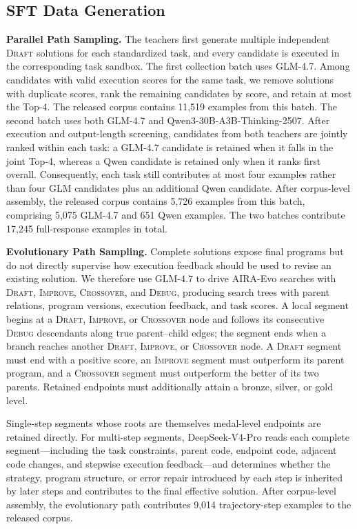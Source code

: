 \subsection{SFT Data Generation}
\label{app:sft-warm-start}

\textbf{Parallel Path Sampling.}
The teachers first generate multiple independent \textsc{Draft} solutions for each standardized task, and every candidate is executed in the corresponding task sandbox. The first collection batch uses GLM-4.7. Among candidates with valid execution scores for the same task, we remove solutions with duplicate scores, rank the remaining candidates by score, and retain at most the Top-4. The released corpus contains 11,519 examples from this batch. The second batch uses both GLM-4.7 and Qwen3-30B-A3B-Thinking-2507. After execution and output-length screening, candidates from both teachers are jointly ranked within each task: a GLM-4.7 candidate is retained when it falls in the joint Top-4, whereas a Qwen candidate is retained only when it ranks first overall. Consequently, each task still contributes at most four examples rather than four GLM candidates plus an additional Qwen candidate. After corpus-level assembly, the released corpus contains 5,726 examples from this batch, comprising 5,075 GLM-4.7 and 651 Qwen examples. The two batches contribute 17,245 full-response examples in total.

\textbf{Evolutionary Path Sampling.}
Complete solutions expose final programs but do not directly supervise how execution feedback should be used to revise an existing solution. We therefore use GLM-4.7 to drive AIRA-Evo searches with \textsc{Draft}, \textsc{Improve}, \textsc{Crossover}, and \textsc{Debug}, producing search trees with parent relations, program versions, execution feedback, and task scores. A local segment begins at a \textsc{Draft}, \textsc{Improve}, or \textsc{Crossover} node and follows its consecutive \textsc{Debug} descendants along true parent--child edges; the segment ends when a branch reaches another \textsc{Draft}, \textsc{Improve}, or \textsc{Crossover} node. A \textsc{Draft} segment must end with a positive score, an \textsc{Improve} segment must outperform its parent program, and a \textsc{Crossover} segment must outperform the better of its two parents. Retained endpoints must additionally attain a bronze, silver, or gold level.

Single-step segments whose roots are themselves medal-level endpoints are retained directly. For multi-step segments, DeepSeek-V4-Pro reads each complete segment---including the task constraints, parent code, endpoint code, adjacent code changes, and stepwise execution feedback---and determines whether the strategy, program structure, or error repair introduced by each step is inherited by later steps and contributes to the final effective solution. After corpus-level assembly, the evolutionary path contributes 9,014 trajectory-step examples to the released corpus.


